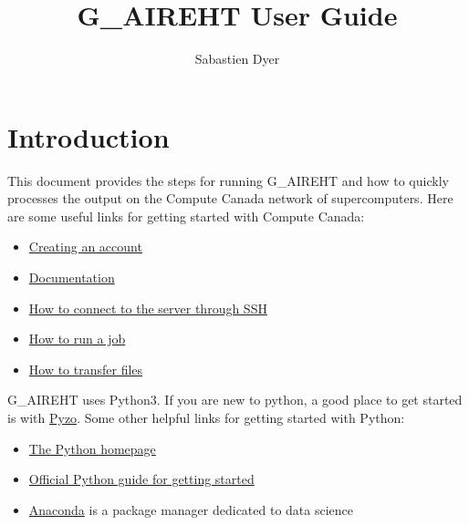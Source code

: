 \documentclass[12pt]{article}
\author{Sabastien Dyer}
\title{G\_AIREHT User Guide}
\begin{document}
\maketitle
\section{Introduction}
This document provides the steps for running G\_AIREHT and how to quickly processes the output on the Compute Canada network of supercomputers. Here are some useful links for getting started with Compute Canada:
\begin{itemize}
  \item[--] \href{https://www.computecanada.ca/research-portal/account-management/apply-for-an-account/}{Creating an account}
  \item[--] \href{https://docs.computecanada.ca/wiki/Compute_Canada_Documentation}{Documentation}
  \item[--] \href{https://docs.computecanada.ca/wiki/SSH}{How to connect to the server through SSH}
  \item[--] \href{https://docs.computecanada.ca/wiki/Running_jobs}{How to run a job}
  \item[--] \href{https://docs.computecanada.ca/wiki/Globus}{How to transfer files}
\end{itemize}
G\_AIREHT uses Python3. If you are new to python, a good place to get started is with \href{https://pyzo.org/}{Pyzo}. Some other helpful links for getting started with Python:
\begin{itemize}
\item[--] \href{https://www.python.org/}{The Python homepage}
\item[--] \href{https://wiki.python.org/moin/BeginnersGuide/Download}{Official Python guide for getting started}
\item[--] \href{https://www.anaconda.com/distribution/}{Anaconda} is a package manager dedicated to data science
\end{itemize}
\end{document}
